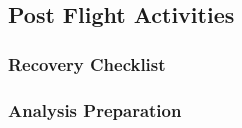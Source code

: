 \subsection{Post Flight Activities}

\subsubsection{Recovery Checklist}
\label{sec:recovery-checklist}

\subsubsection{Analysis Preparation}


